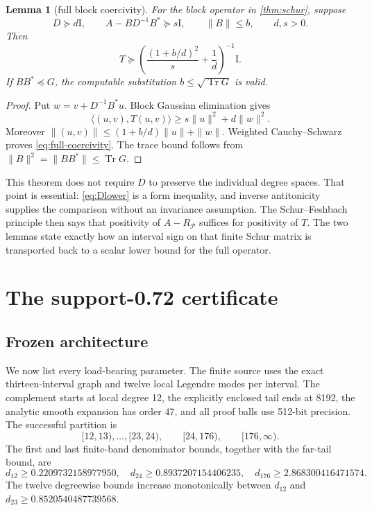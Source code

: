 \documentclass[10pt]{article}
\newtheorem{lemma}[theorem]{Lemma}
\newcommand{\ip}[2]{\langle #1,#2\rangle}
\newcommand{\Tr}{\operatorname{Tr}}
\newcommand{\Id}{\mathrm I}
\begin{document}
\begin{lemma}[full block coercivity]\label{lem:block-coercivity}
For the block operator in \cref{thm:schur}, suppose
\[
 D\succeq d\Id,\qquad
 A-BD^{-1}B^*\succeq s\Id,\qquad \|B\|\le b,
 \qquad d,s>0.
\]
Then
\begin{equation}\label{eq:full-coercivity}
 T\succeq
 \left(\frac{(1+b/d)^2}{s}+\frac1d\right)^{-1}\Id.
\end{equation}
If $BB^*\preceq G$, the computable substitution
$b\le\sqrt{\Tr G}$ is valid.
\end{lemma}
\begin{proof}
Put $w=v+D^{-1}B^*u$.  Block Gaussian elimination gives
\[
 \ip{(u,v)}{T(u,v)}\ge s\|u\|^2+d\|w\|^2.
\]
Moreover
$\|(u,v)\|\le(1+b/d)\|u\|+\|w\|$.
Weighted Cauchy--Schwarz proves \eqref{eq:full-coercivity}.
The trace bound follows from $\|B\|^2=\|BB^*\|\le\Tr G$.
\end{proof}

This theorem does not require $D$ to preserve the individual degree spaces.
That point is essential: \eqref{eq:Dlower} is a form inequality, and inverse
antitonicity supplies the comparison without an invariance assumption.  The
Schur--Feshbach principle then says that positivity of
$A-R_{\mathcal P}$ suffices for positivity of $T$.  The two lemmas state
exactly how an interval sign on that finite Schur matrix is transported back
to a scalar lower bound for the full operator.

\section{The support-0.72 certificate}

\subsection{Frozen architecture}

We now list every load-bearing parameter.  The finite source uses the exact
thirteen-interval graph and twelve local Legendre modes per interval.  The
complement starts at local degree 12, the explicitly enclosed tail ends at
8192, the analytic smooth expansion has order 47, and all proof balls use
512-bit precision.  The successful partition is
\begin{equation}\label{eq:split}
 [12,13),\ldots,[23,24),\qquad[24,176),\qquad[176,\infty).
\end{equation}
The first and last finite-band denominator bounds, together with the far-tail
bound, are
\begin{equation}\label{eq:denoms}
 d_{12}\ge0.2209732158977950,\quad
 d_{24}\ge0.8937207154406235,\quad
 d_{176}\ge2.868300416471574.
\end{equation}
The twelve degreewise bounds increase monotonically between $d_{12}$ and
$d_{23}\ge0.8520540487739568$.
\end{document}
